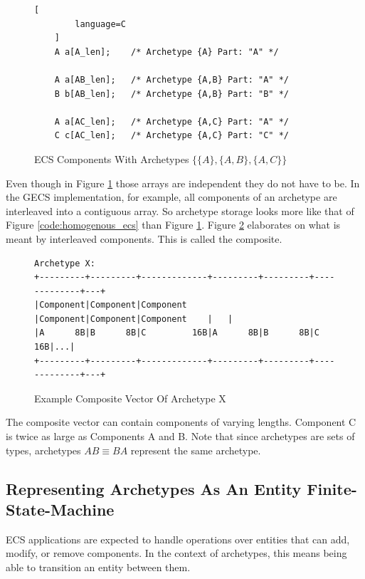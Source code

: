 \begin{figure}[H]
    \begin{lstlisting}[
        language=C
    ]
    A a[A_len];    /* Archetype {A} Part: "A" */

    A a[AB_len];   /* Archetype {A,B} Part: "A" */
    B b[AB_len];   /* Archetype {A,B} Part: "B" */

    A a[AC_len];   /* Archetype {A,C} Part: "A" */
    C c[AC_len];   /* Archetype {A,C} Part: "C" */
    \end{lstlisting}
    \caption{ECS Components With Archetypes $\{\{A\},\{A,B\},\{A,C\}\}$}
    \label{code:ecs_archetypes}
\end{figure}

Even though in Figure \ref{code:ecs_archetypes} those arrays are independent they do not have to be. In the GECS implementation, for example, all components of an archetype are interleaved into a contiguous array. So archetype storage looks more like that of Figure \ref{code:homogenous_ecs} than Figure \ref{code:ecs_archetypes}. Figure \ref{fig:composite} elaborates on what is meant by interleaved components. This is called the composite.


\begin{figure}[htbp]
    \centering
    \begin{verbatim}
Archetype X:                                                             
+---------+---------+-------------+---------+---------+-------------+---+
|Component|Component|Component    |Component|Component|Component    |   |
|A      8B|B      8B|C         16B|A      8B|B      8B|C         16B|...|
+---------+---------+-------------+---------+---------+-------------+---+
    \end{verbatim}
    \caption{Example Composite Vector Of Archetype X}
    \label{fig:composite}
\end{figure}

The composite vector can contain components of varying lengths. Component C is twice as large as Components A and B. Note that since archetypes are sets of types, archetypes $AB \equiv BA$ represent the same archetype.

\subsection{Representing Archetypes As An Entity Finite-State-Machine}
\label{sec:fsm_arc}
ECS applications are expected to handle operations over entities that can add, modify, or remove components. In the context of archetypes, this means being able to transition an entity between them. 

